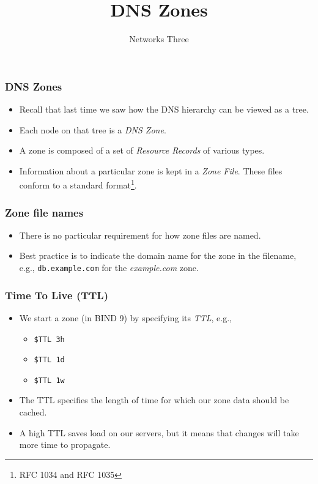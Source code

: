 \documentclass[10pt]{beamer}
\title{DNS Zones}
\author[IN715]{Networks Three}
\institute[Otago Polytechnic]{
  Otago Polytechnic \\
  Dunedin, New Zealand \\
}
\date{}
\begin{document}
\begin{frame}[plain]
  \titlepage
\end{frame}



\begin{frame}
  \frametitle{DNS Zones}

 \begin{itemize}
  \item Recall that last time we saw how the DNS hierarchy can be viewed as a tree.
  \item Each node on that tree is a \emph{DNS Zone}.
  \item A zone is composed of a set of \emph{Resource Records} of various types.
  \item Information about a particular zone is kept in a \emph{Zone File}.  These files conform to a standard format\footnote{RFC 1034 and RFC 1035}.
 \end{itemize}

\end{frame}


\begin{frame}
  \frametitle{Zone file names}

 \begin{itemize}
  \item There is no particular requirement for how zone files are named.
  \item Best practice is to indicate the domain name for the zone in the filename, e.g., \texttt{db.example.com} for the \emph{example.com} zone.
 \end{itemize}

\end{frame}


\begin{frame}
  \frametitle{Time To Live (TTL)}

 \begin{itemize}
  \item We start a zone (in BIND 9) by specifying its \emph{TTL}, e.g.,
      \begin{itemize}
        \item \texttt{\$TTL 3h}
        \item \texttt{\$TTL 1d}
        \item \texttt{\$TTL 1w}
      \end{itemize}
  \item The TTL specifies the length of time for which our zone data should be cached.
  \item A high TTL saves load on our servers, but it means that changes will take more time to propagate.
 \end{itemize}
\end{frame}
\end{document}

